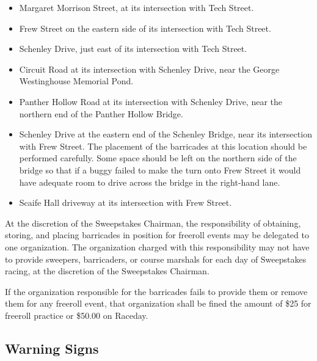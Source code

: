 	\begin{itemize}

		\item Margaret Morrison Street, at its intersection with Tech Street.

		\item Frew Street on the eastern side of its intersection with Tech
		Street.

		\item Schenley Drive, just east of its intersection with Tech Street.

		\item Circuit Road at its intersection with Schenley Drive, near the
		George Westinghouse Memorial Pond.

		\item Panther Hollow Road at its intersection with Schenley Drive, near
		the northern end of the Panther Hollow Bridge.

		\item Schenley Drive at the eastern end of the Schenley Bridge, near its
		intersection with Frew Street. The placement of the barricades at this location
		should be performed carefully. Some space should be left on the northern side
		of the bridge so that if a buggy failed to make the turn onto Frew Street it
		would have adequate room to drive across the bridge in the right-hand lane.

		\item Scaife Hall driveway at its intersection with Frew Street.

	\end{itemize}

	At the discretion of the Sweepstakes Chairman, the responsibility of obtaining,
	storing, and placing barricades in position for freeroll events may be
	delegated to one organization. The organization charged with this
	responsibility may not have to provide sweepers, barricaders, or course marshals
	for each day of Sweepstakes racing, at the discretion of the Sweepstakes
	Chairman.

	If the organization responsible for the barricades fails to provide them or
	remove them for any freeroll event, that organization shall be fined
	the amount of \$25 for freeroll practice or \$50.00 on Raceday.


\subsection{Warning Signs}
\label{subsec:WarnSigns}

